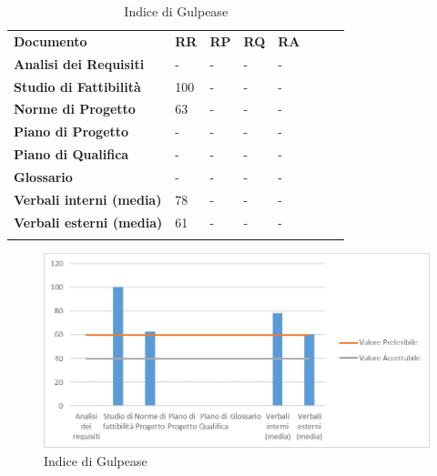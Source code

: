 		\begin{longtable} {						
			>{}p{50mm}  		
			>{}p{8mm}		
			>{}p{8mm}		
			>{}p{8mm}		
			>{}p{8mm}		
			>{}p{8mm}		
			>{}p{8mm}
			>{}p{8mm}				
		}			
		\rowcolor{gray!50}
		\textbf{Documento} & \textbf{RR} & \textbf{RP} & \textbf{RQ} & \textbf{RA} \TBstrut \\ [2mm]
		\textbf{Analisi dei Requisiti} & - & - & - & - \TBstrut \\ [2mm]
		\textbf{Studio di Fattibilità} & 100 & - & - & - \TBstrut \\ [2mm]
		\textbf{Norme di Progetto} & 63 & - & - & - \TBstrut \\ [2mm]
		\textbf{Piano di Progetto} & - & - & - & - \TBstrut \\ [2mm]
		\textbf{Piano di Qualifica} & - & - & - & - \TBstrut \\ [2mm]
		\textbf{Glossario} & - & - & - & - \TBstrut \\ [2mm]
		\textbf{Verbali interni (media)} & 78 & - & - & - \TBstrut \\ [2mm]
		\textbf{Verbali esterni (media)}& 61 & - & - & - \TBstrut \\ [2mm]
		\rowcolor{white}
		\caption{Indice di Gulpease}
		\end{longtable}
		\begin{figure}[H] 	
			\includegraphics[width=\linewidth]{./img/grafici/1.png}	
			\caption{Indice di Gulpease}	
		\end{figure}